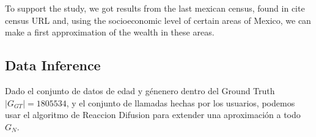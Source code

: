 To support the study, we got results from the last mexican census, found in {cite census URL} and, using the socioeconomic level of certain areas of Mexico, we can make a first approximation of the wealth in these areas.


\subsection{Data Inference}

Dado el conjunto de datos de edad y génenero dentro del Ground Truth \( \left|G_{GT}\right| = 1805534 \), y el conjunto de llamadas hechas por los usuarios, podemos usar el algoritmo de Reaccion Difusion \cite{brea2014} para extender una aproximación a todo \( G_N \).
